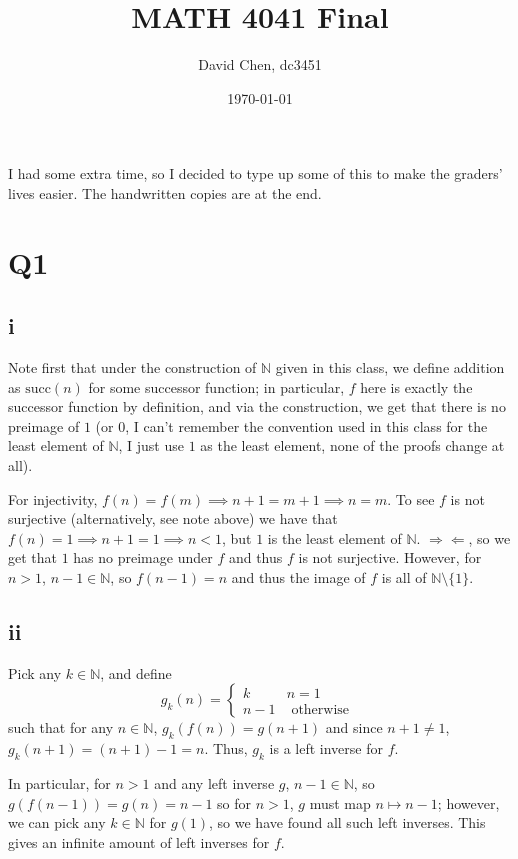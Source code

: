 \documentclass[12pt,letterpaper]{article}
\title{MATH 4041 Final}
\author{David Chen, dc3451}
\date{\today}
\theoremstyle{definition}
\newcommand{\contra}{\Rightarrow\!\Leftarrow}
\newcommand{\N}{\mathbb{N}}
\begin{document}
\maketitle

I had some extra time, so I decided to type up some of this to make the graders' lives easier. The handwritten copies are at the end.

\section*{Q1}
\subsection*{i}

Note first that under the construction of $\N$ given in this class, we define addition as $\text{succ}(n)$ for some successor function; in particular, $f$ here is exactly the successor function by definition, and via the construction, we get that there is no preimage of $1$ (or $0$, I can't remember the convention used in this class for the least element of $\N$, I just use $1$ as the least element, none of the proofs change at all).

For injectivity, $f(n) = f(m) \implies n + 1 = m + 1 \implies n = m$. To see $f$ is not surjective (alternatively, see note above) we have that $f(n) = 1 \implies n + 1 = 1 \implies n < 1$, but $1$ is the least element of $\N$. $\contra$, so we get that $1$ has no preimage under $f$ and thus $f$ is not surjective. However, for $n > 1$, $n - 1 \in \N$, so $f(n - 1) = n$ and thus the image of $f$ is all of $\N \setminus \{1\}$.

\subsection*{ii}

Pick any $k \in \N$, and define
\[
  g_{k}(n) = \begin{cases}
    k & n = 1 \\
    n - 1 & \text{ otherwise }
  \end{cases}
\]
such that for any $n \in \N$, $g_{k}(f(n)) = g(n + 1)$ and since $n + 1 \neq 1$, $g_{k}(n + 1) = (n + 1) - 1 = n$. Thus, $g_{k}$ is a left inverse for $f$.

In particular, for $n > 1$ and any left inverse $g$, $n - 1 \in \N$, so $g(f(n - 1)) = g(n) = n - 1$ so for $n > 1$, $g$ must map $n \mapsto n - 1$; however, we can pick any $k \in \N$ for $g(1)$, so we have found all such left inverses. This gives an infinite amount of left inverses for $f$.
\end{document}
